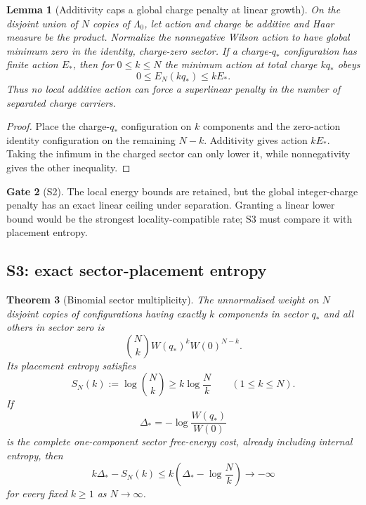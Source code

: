 \documentclass[11pt]{article}
\newtheorem{theorem}{Theorem}[section]
\newtheorem{lemma}[theorem]{Lemma}
\theoremstyle{definition}
\newtheorem{gate}[theorem]{Gate}
\theoremstyle{remark}
\begin{document}
\begin{lemma}[Additivity caps a global charge penalty at linear growth]
\label{lem:energy-linear-ceiling}
On the disjoint union of $N$ copies of $\Lambda_0$, let action and charge be
additive and Haar measure be the product.  Normalize the nonnegative Wilson
action to have global minimum zero in the identity, charge-zero sector.  If a
charge-$q_*$ configuration has finite action $E_*$, then for $0\le k\le N$
the minimum action at total charge $kq_*$ obeys
\[
 0\le E_N(kq_*)\le kE_*.                                    \tag{6.6}
\]
Thus no local additive action can force a superlinear penalty in the number
of separated charge carriers.
\end{lemma}

\begin{proof}
Place the charge-$q_*$ configuration on $k$ components and the zero-action
identity configuration on the remaining $N-k$.  Additivity gives action
$kE_*$.  Taking the infimum in the charged sector can only lower it, while
nonnegativity gives the other inequality.
\end{proof}

\begin{gate}[S2]
The local energy bounds are retained, but the global integer-charge penalty
has an exact linear ceiling under separation.  Granting a linear lower bound
would be the strongest locality-compatible rate; S3 must compare it with
placement entropy.
\end{gate}

\subsection{S3: exact sector-placement entropy}

\begin{theorem}[Binomial sector multiplicity]
\label{thm:binomial-sector-entropy}
The unnormalised weight on $N$ disjoint copies of configurations having
exactly $k$ components in sector $q_*$ and all others in sector zero is
\[
 \binom Nk W(q_*)^kW(0)^{N-k}.                              \tag{6.7}
\]
Its placement entropy satisfies
\[
 S_N(k):=\log\binom Nk\ge k\log\frac Nk
 \qquad(1\le k\le N).                                      \tag{6.8}
\]
If
\[
 \Delta_*=-\log\frac{W(q_*)}{W(0)}
\]
is the complete one-component sector free-energy cost, already including
internal entropy, then
\[
 k\Delta_*-S_N(k)
 \le k\left(\Delta_*-\log\frac Nk\right)
 \longrightarrow-\infty                                   \tag{6.9}
\]
for every fixed $k\ge1$ as $N\to\infty$.
\end{theorem}
\end{document}
